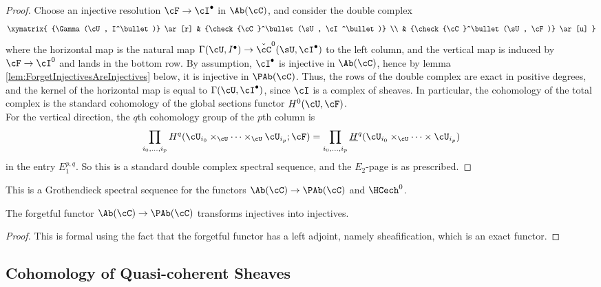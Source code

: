   \begin{proof}
    Choose an injective resolution $\cF\to \cI^\bullet$ in $\Ab(\cC)$, and consider the double complex
$$
\xymatrix{
{\Gamma(\cU,  I^\bullet)}  \ar[r] & {\check{\cC}^\bullet(\sU, \cI^\bullet)} \\ 
& {\check{\cC}^\bullet(\sU, \cF)} \ar[u]
}
$$
where the horizontal map is the natural map $\Gamma(\cU,  I^\bullet) \to \check{\cC}^0(\sU, \cI^\bullet)$ to the left column, and the vertical map is induced by  $\cF\to \cI^0$ and lands in the bottom row. By assumption, $\cI^\bullet$ is injective in $\Ab(\cC)$, hence by lemma \ref{lem:ForgetInjectivesAreInjectives} below, it is injective in $\PAb(\cC)$. Thus, the rows of the double complex are exact in positive degrees, and the kernel of the horizontal map is equal to $\Gamma(\cU, \cI^\bullet)$, since $\cI$ is a complex of sheaves. In particular, the cohomology of the total complex is the standard cohomology of the global sections functor $H^0(\cU, \cF)$. 
\\
For the vertical direction, the $q$th cohomology group of the $p$th column is 
$$ 
\prod_{i_0,\ldots, i_p}  H^q(\cU_{i_0}\times_\cU \cdots \times_\cU \cU_{i_p} ; \cF) =\prod_{i_0, \dots, i_p}\underline{H}^q(\cU_{i_0}\times_\cU \cdots \times \cU_{i_p})
$$
  in the entry $E_1^{p,q}$. So this is a standard double complex spectral sequence, and the $E_2$-page is as prescribed.
  \end{proof}
  
  \begin{remark}
  This is a Grothendieck spectral sequence for the functors $\Ab(\cC) \to \PAb(\cC)$ and $\HCech^0$.
  \end{remark}
  
  \begin{lem} \label{lem:ForgetInjectivesAreInjectives}
The forgetful functor $\Ab(\cC)\to \PAb(\cC)$ transforms injectives into injectives.  
  \end{lem}
  
\begin{proof}
This is formal using the fact that the forgetful functor has a left adjoint, namely sheafification, which is an exact functor. 
\end{proof}

\subsection{Cohomology of Quasi-coherent Sheaves} %

\label{section:CechCohomology}

